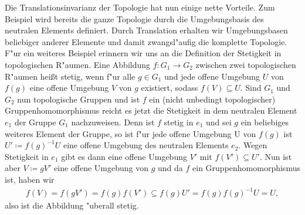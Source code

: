 	Die Translationsinvarianz der Topologie hat nun einige nette Vorteile.
	Zum Beispiel wird bereits die ganze Topologie durch die Umgebungsbasis des neutralen Elements definiert.
	Durch Translation erhalten wir Umgebungsbasen beliebiger anderer Elemente und damit zwangsl"aufig die komplette Topologie.
	F"ur ein weiteres Beispiel erinnern wir uns an die Definition der Stetigkeit in topologischen R"aumen.
	Eine Abbildung $f: G_1 \to G_2$ zwischen zwei topologischen R"aumen heißt stetig, wenn f"ur alle $g\in G_1$ und jede offene Umgebung $U$ von $f(g)$ eine offene Umgebung $V$ von $g$ existiert, sodass $f(V)\subseteq U$.
	Sind $G_1$ und $G_2$ nun topologische Gruppen und ist $f$ ein (nicht unbedingt topologischer) Gruppenhomomorphismus reicht es jetzt die Stetigkeit in dem neutralen Element $e_1$ der Gruppe $G_1$ nachzuweisen.
	Denn ist $f$ stetig in $e_1$ und sei $g$ ein beliebiges weiteres Element der Gruppe, so ist f"ur jede offene Umgebung U von $f(g)$ ist $U'\coloneqq f(g)^{-1}U$ eine offene Umgebung des neutralen Elements $e_2$. 
	Wegen Stetigkeit in $e_1$ gibt es dann eine offene Umgebung $V'$ mit $f(V') \subseteq U'$.
	Nun ist aber $V\coloneqq  gV'$ eine offene Umgebung von $g$ und da $f$ ein Gruppenhomomorphismus ist, haben wir
	\begin{align*}
		f(V) = f(gV') = f(g)f(V') \subseteq f(g) U' =f(g)f(g)^{-1} U = U,
	\end{align*}
	also ist die Abbildung "uberall stetig.
	
